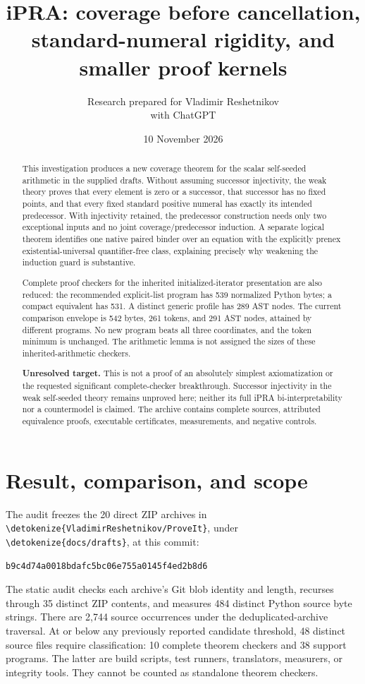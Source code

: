 \documentclass[11pt]{article}
\title{\textbf{iPRA: coverage before cancellation,\\
standard-numeral rigidity, and smaller proof kernels}}
\author{Research prepared for Vladimir Reshetnikov\\with ChatGPT}
\date{10 November 2026}
\theoremstyle{definition}\newtheorem{definition}[theorem]{Definition}
\newcommand{\file}[1]{\expandafter\nolinkurl\expandafter{\detokenize{#1}}}
\begin{document}
\maketitle
\begin{abstract}
This investigation produces a new coverage theorem for the scalar
self-seeded arithmetic in the supplied drafts. Without assuming successor
injectivity, the weak theory proves that every element is zero or a successor,
that successor has no fixed points, and that every fixed standard positive
numeral has exactly its intended predecessor. With injectivity retained,
the predecessor construction needs only two exceptional inputs and no joint
coverage/predecessor induction. A separate logical theorem identifies one
native paired binder over an equation with the explicitly prenex
existential-universal quantifier-free class, explaining precisely why
weakening the induction guard is substantive.

Complete proof checkers for the inherited initialized-iterator presentation
are also reduced: the recommended explicit-list program has 539 normalized
Python bytes; a compact equivalent has 531. A distinct generic profile has
289 AST nodes. The current comparison envelope is 542 bytes, 261 tokens,
and 291 AST nodes, attained by different programs. No new program beats
all three coordinates, and the token minimum is unchanged. The arithmetic
lemma is not assigned the sizes of these inherited-arithmetic checkers.

\textbf{Unresolved target.} This is not a proof of an absolutely simplest
axiomatization or the requested significant complete-checker breakthrough.
Successor injectivity in the weak self-seeded theory remains unproved here;
neither its full iPRA bi-interpretability nor a countermodel is claimed.
The archive contains complete sources, attributed equivalence proofs,
executable certificates, measurements, and negative controls.
\end{abstract}
\newpage
\setcounter{tocdepth}{1}
\tableofcontents
\newpage

\section{Result, comparison, and scope}
\label{sec:result}
The audit freezes the 20 direct ZIP archives in
\file{VladimirReshetnikov/ProveIt}, under \file{docs/drafts}, at this
commit:\cite{source}
\begin{center}\small
\texttt{b9c4d74a0018bdafc5bc06e755a0145f4ed2b8d6}
\end{center}
The static audit checks each archive's Git blob identity and length,
recurses through 35 distinct ZIP contents, and measures 484 distinct
Python source byte strings. There are 2,744 source occurrences under the
deduplicated-archive traversal. At or below any previously reported
candidate threshold, 48 distinct source files require classification:
10 complete theorem checkers and 38 support programs. The latter are
build scripts, test runners, translators, measurers, or integrity tools.
They cannot be counted as standalone theorem checkers.
\end{document}
